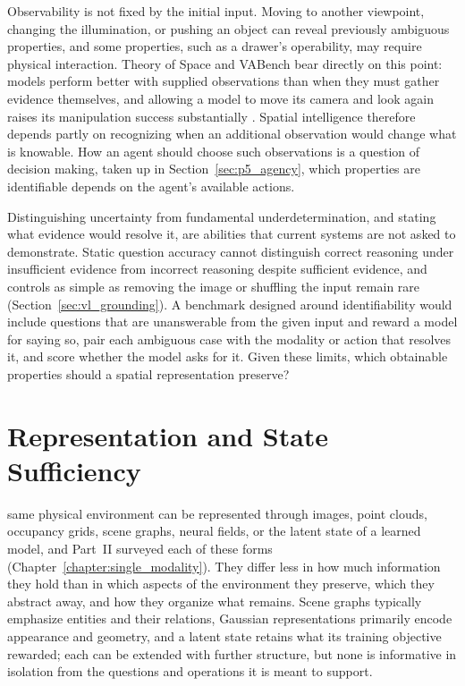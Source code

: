 Observability is not fixed by the initial input.
Moving to another viewpoint, changing the illumination, or pushing an object can reveal previously ambiguous properties, and some properties, such as a drawer's operability, may require physical interaction.
Theory of Space and VABench bear directly on this point: models perform better with supplied observations than when they must gather evidence themselves, and allowing a model to move its camera and look again raises its manipulation success substantially \cite{zhang2026theory,zhang2026vabench}.
Spatial intelligence therefore depends partly on recognizing when an additional observation would change what is knowable.
How an agent should choose such observations is a question of decision making, taken up in Section~\ref{sec:p5_agency}, which properties are identifiable depends on the agent's available actions.

Distinguishing uncertainty from fundamental underdetermination, and stating what evidence would resolve it, are abilities that current systems are not asked to demonstrate.
Static question accuracy cannot distinguish correct reasoning under insufficient evidence from incorrect reasoning despite sufficient evidence, and controls as simple as removing the image or shuffling the input remain rare (Section~\ref{sec:vl_grounding}).
A benchmark designed around identifiability would include questions that are unanswerable from the given input and reward a model for saying so, pair each ambiguous case with the modality or action that resolves it, and score whether the model asks for it.
Given these limits, which obtainable properties should a spatial representation preserve?


\section{Representation and State Sufficiency}
\label{sec:p5_sufficiency}
\label{sec:p5_cognitive}

 same physical environment can be represented through images, point clouds, occupancy grids, scene graphs, neural fields, or the latent state of a learned model, and Part~II surveyed each of these forms (Chapter~\ref{chapter:single_modality}).
They differ less in how much information they hold than in which aspects of the environment they preserve, which they abstract away, and how they organize what remains.
Scene graphs typically emphasize entities and their relations, Gaussian representations primarily encode appearance and geometry, and a latent state retains what its training objective rewarded; each can be extended with further structure, but none is informative in isolation from the questions and operations it is meant to support.

